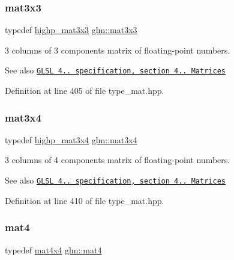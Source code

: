 \subsubsection{\texorpdfstring{mat3x3}{mat3x3}}
{\footnotesize\ttfamily typedef \hyperlink{group__core__precision_ga8a3703cc71cdfc8928eddf46b3763c4b}{highp\+\_\+mat3x3} \hyperlink{group__core__types_ga6fecca6a869070b6bf8acb44ce1c2af3}{glm\+::mat3x3}}

3 columns of 3 components matrix of floating-\/point numbers.

\begin{DoxySeeAlso}{See also}
\href{http://www.opengl.org/registry/doc/GLSLangSpec.4.20.8.pdf}{\tt G\+L\+SL 4.. specification, section 4.. Matrices} 
\end{DoxySeeAlso}


Definition at line 405 of file type\+\_\+mat.\+hpp.

\mbox{\label{group__core__types_ga5524ae15d7fc00a68b8e0e3a0733cc2a}} 
\subsubsection{\texorpdfstring{mat3x4}{mat3x4}}
{\footnotesize\ttfamily typedef \hyperlink{group__core__precision_gabaf9c8dd35db715b1093042703f879d0}{highp\+\_\+mat3x4} \hyperlink{group__core__types_ga5524ae15d7fc00a68b8e0e3a0733cc2a}{glm\+::mat3x4}}

3 columns of 4 components matrix of floating-\/point numbers.

\begin{DoxySeeAlso}{See also}
\href{http://www.opengl.org/registry/doc/GLSLangSpec.4.20.8.pdf}{\tt G\+L\+SL 4.. specification, section 4.. Matrices} 
\end{DoxySeeAlso}


Definition at line 410 of file type\+\_\+mat.\+hpp.

\mbox{\label{group__core__types_ga7dcd2365c2e368e6af5b7adeb6a9c8df}} 
\subsubsection{\texorpdfstring{mat4}{mat4}}
{\footnotesize\ttfamily typedef \hyperlink{group__core__types_ga63e3ee9447ed593484140a9368e738ec}{mat4x4} \hyperlink{group__core__types_ga7dcd2365c2e368e6af5b7adeb6a9c8df}{glm\+::mat4}}

